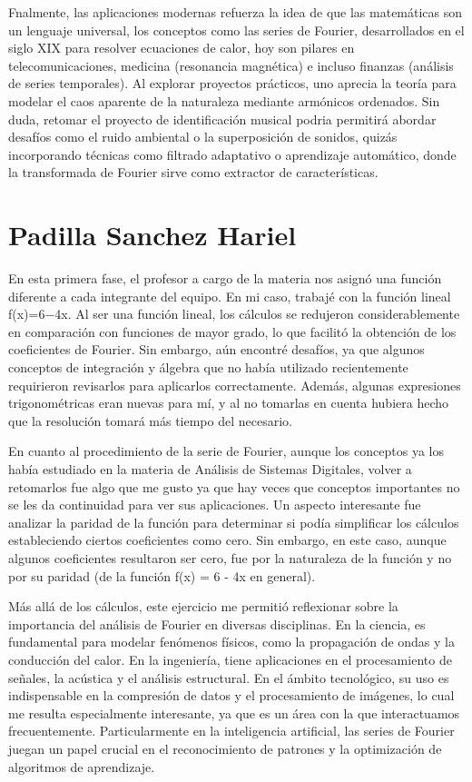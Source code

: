 {Fnalmente, las aplicaciones modernas refuerza la idea de que las matemáticas son un lenguaje universal, los conceptos como las series de Fourier, desarrollados en el siglo XIX para resolver ecuaciones de calor, hoy son pilares en telecomunicaciones, medicina (resonancia magnética) e incluso finanzas (análisis de series temporales). Al explorar proyectos prácticos, uno aprecia la teoría para modelar el caos aparente de la naturaleza mediante armónicos ordenados. Sin duda, retomar el proyecto de identificación musical podria permitirá abordar desafíos como el ruido ambiental o la superposición de sonidos, quizás incorporando técnicas como filtrado adaptativo o aprendizaje automático, donde la transformada de Fourier sirve como extractor de características. 

\newpage
\section{Padilla Sanchez Hariel}

En esta primera fase, el profesor a cargo de la materia nos asignó una función diferente a cada integrante del equipo. En mi caso, trabajé con la función lineal f(x)=6−4x. Al ser una función lineal, los cálculos se redujeron considerablemente en comparación con funciones de mayor grado, lo que facilitó la obtención de los coeficientes de Fourier. Sin embargo, aún encontré desafíos, ya que algunos conceptos de integración y álgebra que no había utilizado recientemente requirieron revisarlos para aplicarlos correctamente. Además, algunas expresiones trigonométricas eran nuevas para mí, y al no tomarlas en cuenta hubiera hecho que la resolución tomará más tiempo del necesario.

En cuanto al procedimiento de la serie de Fourier, aunque los conceptos ya los había estudiado en la materia de Análisis de Sistemas Digitales, volver a retomarlos fue algo que me gusto ya que hay veces que conceptos importantes no se les da continuidad para ver sus aplicaciones. Un aspecto interesante fue analizar la paridad de la función para determinar si podía simplificar los cálculos estableciendo ciertos coeficientes como cero. Sin embargo, en este caso, aunque algunos coeficientes resultaron ser cero, fue por la naturaleza de la función y no por su paridad (de la función f(x) = 6 - 4x en general).

Más allá de los cálculos, este ejercicio me permitió reflexionar sobre la importancia del análisis de Fourier en diversas disciplinas. En la ciencia, es fundamental para modelar fenómenos físicos, como la propagación de ondas y la conducción del calor. En la ingeniería, tiene aplicaciones en el procesamiento de señales, la acústica y el análisis estructural. En el ámbito tecnológico, su uso es indispensable en la compresión de datos y el procesamiento de imágenes, lo cual me resulta especialmente interesante, ya que es un área con la que interactuamos frecuentemente. Particularmente en la inteligencia artificial, las series de Fourier juegan un papel crucial en el reconocimiento de patrones y la optimización de algoritmos de aprendizaje.

}
